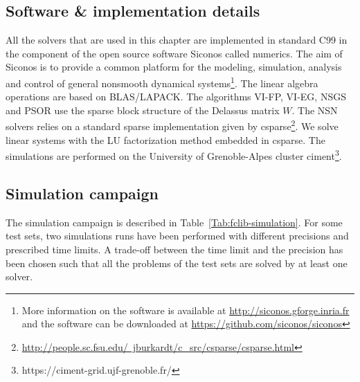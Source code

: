 

\subsection{Software \& implementation details}

All the solvers that are used in this chapter are implemented in standard C99 in the component of the open source software Siconos called numerics. The aim of Siconos is to provide a common platform for the modeling, simulation, analysis and control of general nonsmooth dynamical systems\footnote{More information on the software is available at \href{http://siconos.gforge.inria.fr}{http://siconos.gforge.inria.fr} and the software can be downloaded at  \href{https://github.com/siconos/siconos}{https://github.com/siconos/siconos}}. The linear algebra operations are based on BLAS/LAPACK. The algorithms {\sf VI-FP}, {\sf VI-EG}, {\sf NSGS} and {\sf PSOR} use the sparse block structure of the Delassus matrix $W$. The {\sf NSN} solvers relies on a standard sparse implementation given by csparse\footnote{\href{http://people.sc.fsu.edu/~jburkardt/c_src/csparse/csparse.html}{http://people.sc.fsu.edu/~jburkardt/c\_src/csparse/csparse.html}}.  We solve linear systems with the LU factorization method embedded in csparse. The simulations are performed on the University of Grenoble-Alpes cluster {\sc ciment}\footnote{https://ciment-grid.ujf-grenoble.fr/}.




\subsection{Simulation campaign}
The simulation campaign is described in Table~\ref{Tab:fclib-simulation}. For some test sets, two simulations runs have been performed with different precisions and prescribed time limits. A trade-off between the time limit and the precision has been chosen such that all the problems of the test sets are solved by at least one solver.


